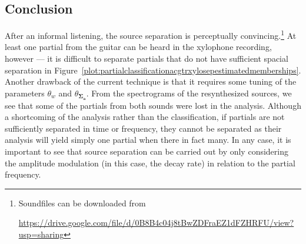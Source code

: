 \subsection{Conclusion}

After an informal listening, the source separation is perceptually
convincing.\footnote{Soundfiles can be downloaded from \par
\url{https://drive.google.com/file/d/0B8B4c04j8tBwZDFraEZ1dFZHRFU/view?usp=sharing}}
At least one partial from the guitar can be heard in the xylophone recording,
however --- it is difficult to separate partials that do not have sufficient
spacial separation in
Figure~\ref{plot:partialclassificationacgtrxylosepestimatedmemberships}. Another
drawback of the current technique is that it requires some tuning of the
parameters $\theta_{w}$ and $\theta_{\boldsymbol{\Sigma_{\boldsymbol{a}}}}$.
From the spectrograms of the resynthesized sources, we see that some of the
partials from both sounds were lost in the analysis.  Although a shortcoming of
the analysis rather than the classification, if partials are not sufficiently
separated in time or frequency, they cannot be separated as their analysis will
yield simply one partial when there in fact many. In any case, it is important
to see that source separation can be carried out by only considering the
amplitude modulation (in this case, the decay rate) in relation to the partial
frequency.
